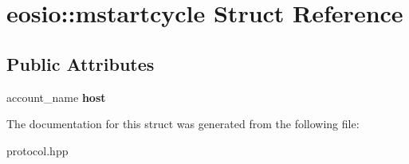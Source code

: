 \hypertarget{structeosio_1_1mstartcycle}{}\section{eosio\+:\+:mstartcycle Struct Reference}
\label{structeosio_1_1mstartcycle}
\subsection*{Public Attributes}
\begin{DoxyCompactItemize}
\item 
\mbox{\label{structeosio_1_1mstartcycle_a561df73258b4b2c0de4a60c12c8c6e8d}} 
account\+\_\+name {\bfseries host}
\end{DoxyCompactItemize}


The documentation for this struct was generated from the following file\+:\begin{DoxyCompactItemize}
\item 
protocol.\+hpp\end{DoxyCompactItemize}

